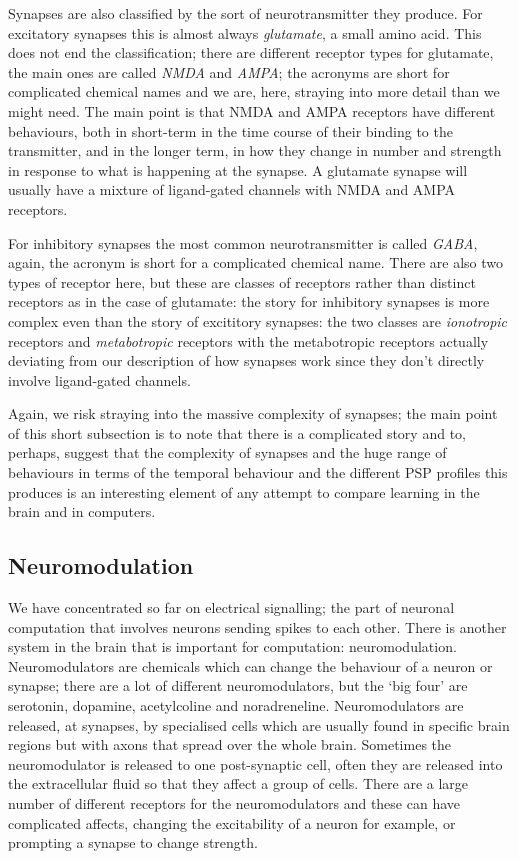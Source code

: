 \documentclass[12pt]{article}
\begin{document}
Synapses are also classified by the sort of neurotransmitter they
produce. For excitatory synapses this is almost always
\textsl{glutamate}, a small amino acid. This does not end the
classification; there are different receptor types for glutamate, the
main ones are called \textsl{NMDA} and \textsl{AMPA}; the acronyms are
short for complicated chemical names and we are, here, straying into
more detail than we might need. The main point is that NMDA and AMPA
receptors have different behaviours, both in short-term in the time
course of their binding to the transmitter, and in the longer term, in
how they change in number and strength in response to what is
happening at the synapse. A glutamate synapse will usually have a
mixture of ligand-gated channels with NMDA and AMPA receptors.

For inhibitory synapses the most common neurotransmitter is called
\textsl{GABA}, again, the acronym is short for a complicated chemical
name. There are also two types of receptor here, but these are classes
of receptors rather than distinct receptors as in the case of
glutamate: the story for inhibitory synapses is more complex even than
the story of excititory synapses: the two classes are
\textsl{ionotropic} receptors and \textsl{metabotropic} receptors with
the metabotropic receptors actually deviating from our description of
how synapses work since they don't directly involve ligand-gated
channels.

Again, we risk straying into the massive complexity of synapses; the
main point of this short subsection is to note that there is a
complicated story and to, perhaps, suggest that the complexity of
synapses and the huge range of behaviours in terms of the temporal
behaviour and the different PSP profiles this produces is an
interesting element of any attempt to compare learning in the brain
and in computers.

\subsection*{Neuromodulation}

We have concentrated so far on electrical signalling; the part of
neuronal computation that involves neurons sending spikes to each
other. There is another system in the brain that is important for
computation: neuromodulation. Neuromodulators are chemicals which can
change the behaviour of a neuron or synapse; there are a lot of
different neuromodulators, but the `big four' are serotonin, dopamine,
acetylcoline and noradreneline. Neuromodulators are released, at
synapses, by specialised cells which are usually found in specific
brain regions but with axons that spread over the whole
brain. Sometimes the neuromodulator is released to one post-synaptic
cell, often they are released into the extracellular fluid so that
they affect a group of cells. There are a large number of different
receptors for the neuromodulators and these can have complicated
affects, changing the excitability of a neuron for example, or
prompting a synapse to change strength.
\end{document}
